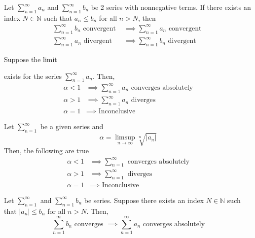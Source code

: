   \begin{theorem}
    Let $\sum_{n=1}^\infty a_n$ and $\sum_{n=1}^\infty b_n$ be 2 series with nonnegative terms. If there exists an index $N \in \mathbb{N}$ such that $a_n \leq b_n$ for all $n >N$, then 
    \begin{align*}
      \sum_{n=1}^\infty b_n \text{ convergent } & \implies \sum_{n=1}^\infty a_n \text{ convergent } \\
      \sum_{n=1}^\infty a_n \text{ divergent } & \implies \sum_{n=1}^\infty b_n \text{ divergent }
    \end{align*}
  \end{theorem}

  \begin{theorem}
    Suppose the limit 
    exists for the series $\sum_{n=1}^\infty a_n$. Then, 
    \begin{align*}
        \alpha < 1 & \implies \sum_{n=1}^\infty a_n \text{ converges absolutely} \\
        \alpha > 1 & \implies \sum_{n=1}^\infty a_n \text{ diverges} \\
        \alpha = 1 & \implies \text{ Inconclusive}
    \end{align*}
  \end{theorem}

  \begin{theorem}
    Let $\sum_{n=1}^\infty$ be a given series and 
    \begin{equation}
      \alpha = \limsup_{n\rightarrow \infty} \sqrt[n]{|a_n|}
    \end{equation}
    Then, the following are true
    \begin{align*}
      \alpha < 1 & \implies \sum_{n=1}^\infty \text{ converges absolutely} \\
      \alpha > 1 & \implies \sum_{n=1}^\infty \text{ diverges} \\
      \alpha = 1 & \implies \text{ Inconclusive} 
    \end{align*}
  \end{theorem}

  \begin{theorem}
    Let $\sum_{n=1}^\infty$ and $\sum_{n=1}^\infty b_n$ be series. Suppose there exists an index $N \in \mathbb{N}$ such that $|a_n| \leq b_n$ for all $n>N$. Then, 
    \begin{equation}
      \sum_{n=1}^\infty b_n \text{ converges } \implies \sum_{n=1}^\infty a_n \text{ converges absolutely}
    \end{equation}
  \end{theorem}

